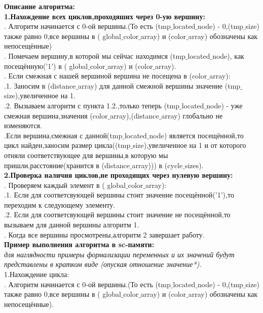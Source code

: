 \documentclass[a4paper,11pt]{article}
\begin{document}
\begin{flushleft}
\Large{\textbf{Описание алгоритма:}}\\
\textbf{1.Нахождение всех циклов,проходяших через 0-ую вершину:} \\
. Алгоритм начинается с 0-ой вершины.(То есть (tmp$\_$located$\_$node) - 0,(tmp$\_$size) также равно 0,все вершины  в ( global$\_$color$\_$array) и (color$\_$array) обозначены как непосещённые) \\
. Помечаем вершину,в которой мы сейчас находимся (tmp$\_$located$\_$node), как посещённую('1') в ( global$\_$color$\_$array) и (color$\_$array). \\
. Если смежная с нашей вершиной вершина не посещена в (color$\_$array): \\
\quad {}.1. Заносим в (distance$\_$array) для данной смежной вершины значение (tmp$\_$size),увеличенное на 1. \\
\quad {}.2. Вызываем алгоритм с пункта 1.2.,только теперь (tmp$\_$located$\_$node) - уже смежная вершина,значения (color$\_$array),(distance$\_$array) глобально не изменяются.  \\
.Если вершина,смежная с данной(tmp$\_$located$\_$node) является посещённой,то цикл найден,заносим размер цикла((tmp$\_$size),увеличенное на 1 и от которого отняли соответствующее для вершины,в которую мы пришли,расстояние(хранится в (distance$\_$array))) в (cycle$\_$sizes). \\ 
\textbf{2.Проверка наличия циклов,не проходящих через нулевую вершину:} \\
. Проверяем каждый элемент в ( global$\_$color$\_$array): \\
\quad {}.1. Если для соответсвующей вершины стоит значение посещённой('1'),то переходим к следующему элементу. \\
\quad {}.2. Если для соответсвующей вершины стоит значение не посещённой,то вызываем для данной вершины алгоритм 1.  \\
. Когда все вершины просмотрены,алгоритм 2 завершает работу. \\
\textbf{Пример выполнения алгоритма в sc-памяти:} \\
\textit{для наглядности примеры формализации переменных и их значений будут представлены в кратком виде (опуская отношение значение*).}\\
1.Нахождение цикла: \\
. Алгоритм начинается с 0-ой вершины.(То есть (tmp$\_$located$\_$node) - 0,(tmp$\_$size) также равно 0,все вершины  в ( global$\_$color$\_$array) и (color$\_$array) обозначены как непосещённые). \\

\end{flushleft}
\end{document}
